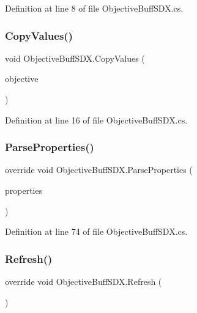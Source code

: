 Definition at line 8 of file Objective\+Buff\+S\+D\+X.\+cs.

\mbox{\label{class_objective_buff_s_d_x_ae751ff717d73f70e38fd95b907bc9949}} 
\subsubsection{\texorpdfstring{CopyValues()}{CopyValues()}}
{\footnotesize\ttfamily void Objective\+Buff\+S\+D\+X.\+Copy\+Values (\begin{DoxyParamCaption}\item[{\mbox{\hyperlink{class_objective_buff_s_d_x}{Objective\+Buff\+S\+DX}}}]{objective }\end{DoxyParamCaption})\hspace{0.3cm}{\ttfamily [protected]}}



Definition at line 16 of file Objective\+Buff\+S\+D\+X.\+cs.

\mbox{\label{class_objective_buff_s_d_x_ac7613fa46712ddfa0c7c4c4b848eca08}} 
\subsubsection{\texorpdfstring{ParseProperties()}{ParseProperties()}}
{\footnotesize\ttfamily override void Objective\+Buff\+S\+D\+X.\+Parse\+Properties (\begin{DoxyParamCaption}\item[{Dynamic\+Properties}]{properties }\end{DoxyParamCaption})}



Definition at line 74 of file Objective\+Buff\+S\+D\+X.\+cs.

\mbox{\label{class_objective_buff_s_d_x_adf0204ccd2aae5c18ab512c24b1681ec}} 
\subsubsection{\texorpdfstring{Refresh()}{Refresh()}}
{\footnotesize\ttfamily override void Objective\+Buff\+S\+D\+X.\+Refresh (\begin{DoxyParamCaption}{ }\end{DoxyParamCaption})}



